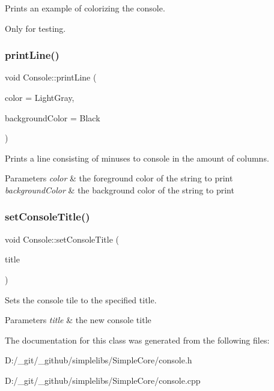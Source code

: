 Prints an example of colorizing the console. 

Only for testing. \mbox{\label{class_console_ad7a14ece00d66f511beadc989c8aa21e}} 
\subsubsection{\texorpdfstring{printLine()}{printLine()}}
{\footnotesize\ttfamily void Console\+::print\+Line (\begin{DoxyParamCaption}\item[{Console\+Color}]{color = {\ttfamily LightGray},  }\item[{Console\+Color}]{background\+Color = {\ttfamily Black} }\end{DoxyParamCaption})\hspace{0.3cm}{\ttfamily [static]}}



Prints a line consisting of minuses to console in the amount of columns. 


\begin{DoxyParams}{Parameters}
{\em color} & the foreground color of the string to print \\
\hline
{\em background\+Color} & the background color of the string to print \\
\hline
\end{DoxyParams}
\mbox{\label{class_console_a897788b6d4f90a73b1894c4a83bb8280}} 
\subsubsection{\texorpdfstring{setConsoleTitle()}{setConsoleTitle()}}
{\footnotesize\ttfamily void Console\+::set\+Console\+Title (\begin{DoxyParamCaption}\item[{const \mbox{\hyperlink{class_a_string}{A\+String}} \&}]{title }\end{DoxyParamCaption})\hspace{0.3cm}{\ttfamily [static]}}



Sets the console tile to the specified title. 


\begin{DoxyParams}{Parameters}
{\em title} & the new console title \\
\hline
\end{DoxyParams}


The documentation for this class was generated from the following files\+:\begin{DoxyCompactItemize}
\item 
D\+:/\+\_\+git/\+\_\+github/simplelibs/\+Simple\+Core/console.\+h\item 
D\+:/\+\_\+git/\+\_\+github/simplelibs/\+Simple\+Core/console.\+cpp\end{DoxyCompactItemize}

